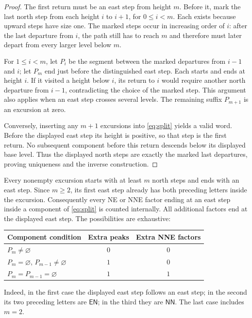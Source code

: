 \documentclass[11pt]{article}
\newcommand{\N}{\mathsf{N}}
\newcommand{\E}{\mathsf{E}}
\begin{document}
\begin{proof}
The first return must be an east step from height $m$. Before it, mark
the last north step from each height $i$ to $i+1$, for $0\leq i<m$.
Each exists because upward steps have size one. The marked steps occur
in increasing order of $i$: after the last departure from $i$, the path
still has to reach $m$ and therefore must later depart from every larger
level below $m$.

For $1\leq i<m$, let $P_i$ be the segment between the marked departures
from $i-1$ and $i$; let $P_m$ end just before the distinguished east step.
Each starts and ends at height $i$. If it visited a height below $i$,
its return to $i$ would require another north departure from $i-1$,
contradicting the choice of the marked step. This argument also applies
when an east step crosses several levels. The remaining suffix $P_{m+1}$
is an excursion at zero.

Conversely, inserting any $m+1$ excursions into \eqref{eq:split} yields
a valid word. Before the displayed east step its height is positive,
so that step is the first return. No subsequent component before this
return descends below its displayed base level. Thus the displayed
north steps are exactly the marked last departures, proving uniqueness
and the inverse construction.
\end{proof}

Every nonempty excursion starts with at least $m$ north steps and ends
with an east step. Since $m\geq2$, its first east step already has both
preceding letters inside the excursion. Consequently every NE or NNE
factor ending at an east step inside a component of \eqref{eq:split}
is counted internally. All additional factors end at the displayed east
step. The possibilities are exhaustive:
\begin{center}
\begin{tabular}{@{}lcc@{}}
\toprule
Component condition & Extra peaks & Extra NNE factors\\
\midrule
$P_m\ne\varnothing$ & $0$ & $0$\\
$P_m=\varnothing$, $P_{m-1}\ne\varnothing$ & $1$ & $0$\\
$P_m=P_{m-1}=\varnothing$ & $1$ & $1$\\
\bottomrule
\end{tabular}
\end{center}
Indeed, in the first case the displayed east step follows an east step;
in the second its two preceding letters are $\E\N$; in the third they
are $\N\N$. The last case includes $m=2$.
\end{document}
